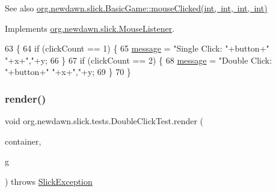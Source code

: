 \begin{DoxySeeAlso}{See also}
\mbox{\hyperlink{classorg_1_1newdawn_1_1slick_1_1_basic_game_a3103343304121288da2e40cc49466f94}{org.\+newdawn.\+slick.\+Basic\+Game\+::mouse\+Clicked(int, int, int, int)}} 
\end{DoxySeeAlso}


Implements \mbox{\hyperlink{interfaceorg_1_1newdawn_1_1slick_1_1_mouse_listener_a3e42b74c252ecdc7418b0ee8bcae5510}{org.\+newdawn.\+slick.\+Mouse\+Listener}}.


\begin{DoxyCode}
63                                                                        \{
64         \textcolor{keywordflow}{if} (clickCount == 1) \{
65             \mbox{\hyperlink{classorg_1_1newdawn_1_1slick_1_1tests_1_1_double_click_test_ab7f5f424e09fe1617e6d75e1cafb057e}{message}} = \textcolor{stringliteral}{"Single Click: "}+button+\textcolor{stringliteral}{" "}+x+\textcolor{stringliteral}{","}+y;
66         \}
67         \textcolor{keywordflow}{if} (clickCount == 2) \{
68             \mbox{\hyperlink{classorg_1_1newdawn_1_1slick_1_1tests_1_1_double_click_test_ab7f5f424e09fe1617e6d75e1cafb057e}{message}} = \textcolor{stringliteral}{"Double Click: "}+button+\textcolor{stringliteral}{" "}+x+\textcolor{stringliteral}{","}+y;
69         \}
70     \}
\end{DoxyCode}
\mbox{\label{classorg_1_1newdawn_1_1slick_1_1tests_1_1_double_click_test_ab6ee51a36736c603dad7aa7e89dc7ff1}} 
\subsubsection{\texorpdfstring{render()}{render()}}
{\footnotesize\ttfamily void org.\+newdawn.\+slick.\+tests.\+Double\+Click\+Test.\+render (\begin{DoxyParamCaption}\item[{\mbox{\hyperlink{classorg_1_1newdawn_1_1slick_1_1_game_container}{Game\+Container}}}]{container,  }\item[{\mbox{\hyperlink{classorg_1_1newdawn_1_1slick_1_1_graphics}{Graphics}}}]{g }\end{DoxyParamCaption}) throws \mbox{\hyperlink{classorg_1_1newdawn_1_1slick_1_1_slick_exception}{Slick\+Exception}}\hspace{0.3cm}{\ttfamily [inline]}}

